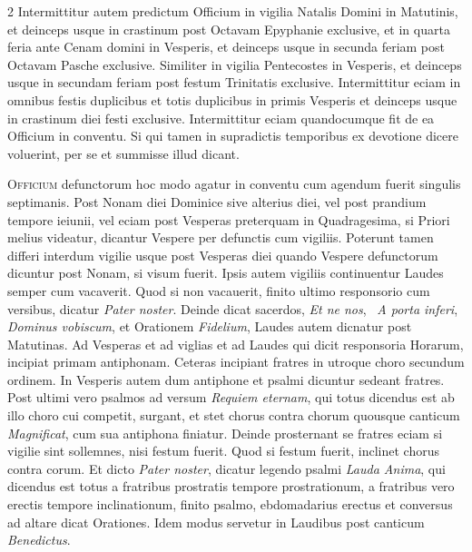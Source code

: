 \begin{multicols*}{2}
Intermittitur autem predictum Officium in vigilia Natalis Domini in Matutinis, et deinceps usque in crastinum post Octavam Epyphanie exclusive, et in quarta feria ante Cenam domini in Vesperis, et deinceps usque in secunda feriam post Octavam Pasche exclusive. Similiter in vigilia Pentecostes in Vesperis, et deinceps usque in secundam feriam post festum Trinitatis exclusive.
Intermittitur eciam in omnibus festis duplicibus et totis duplicibus in primis Vesperis et deinceps usque in crastinum diei festi exclusive. Intermittitur eciam quandocumque fit de ea Officium in conventu. Si qui tamen in supradictis temporibus ex devotione dicere voluerint, per se et summisse illud dicant.

{\color{Red} }
\lettrine[lines=2]{\zallmancaps \color{Blue} O}{fficium} defunctorum hoc modo agatur in conventu cum agendum fuerit singulis septimanis. Post Nonam diei Dominice sive alterius diei, vel post prandium tempore ieiunii, vel eciam post Vesperas preterquam in Quadragesima, si Priori melius videatur, dicantur Vespere per defunctis cum vigiliis. Poterunt tamen differi interdum vigilie usque post Vesperas diei quando Vespere defunctorum dicuntur post Nonam, si visum fuerit.
Ipsis autem vigiliis continuentur Laudes semper cum vacaverit.
Quod si non vacauerit, finito ultimo responsorio cum versibus, dicatur \textit{Pater noster}. Deinde dicat sacerdos, \textit{Et ne nos}, \Vbar \ \textit{A porta inferi}, \textit{Dominus vobiscum}, et Orationem \textit{Fidelium}, Laudes autem dicnatur post Matutinas. Ad Vesperas et ad viglias et ad Laudes qui dicit responsoria Horarum, incipiat primam antiphonam. Ceteras incipiant fratres in utroque choro secundum ordinem.
In Vesperis autem dum antiphone et psalmi dicuntur sedeant fratres. Post ultimi vero psalmos ad versum \textit{Requiem eternam}, qui totus dicendus est ab illo choro cui competit, surgant, et stet chorus contra chorum quousque canticum \textit{Magnificat}, cum sua antiphona finiatur.
Deinde prosternant se fratres eciam si vigilie sint sollemnes, nisi festum fuerit. Quod si festum fuerit, inclinet chorus contra corum. Et dicto \textit{Pater noster}, dicatur legendo psalmi \textit{Lauda Anima}, qui dicendus est totus a fratribus prostratis tempore prostrationum, a fratribus vero erectis tempore inclinationum, finito psalmo, ebdomadarius erectus et conversus ad altare dicat Orationes. Idem modus servetur in Laudibus post canticum \textit{Benedictus}.

\end{multicols*}
